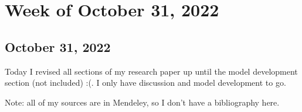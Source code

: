 \documentclass[11pt,letterpaper]{article}
\begin{document}
\section{Week of October 31, 2022}
\subsection{October 31, 2022}
Today I revised all sections of my research paper up until the model development section (not included) :(. I only have discussion and model development to go.



\newpage
Note: all of my sources are in Mendeley, so I don't have a bibliography here.
\end{document}
